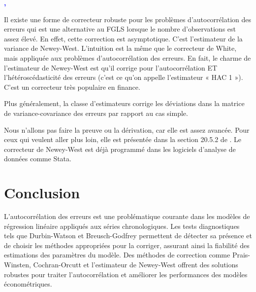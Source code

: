 \documentclass[14pt]{extarticle} %
\theoremstyle{definition}
\theoremstyle{plain}
\begin{document}
\textbf{\textcolor{blue}{\cite{gujarati2010}, \cite{greene2018}}}

Il existe une forme de correcteur robuste pour les problèmes d’autocorrélation des erreurs qui est une alternative au FGLS lorsque le nombre d’observations est assez élevé. En effet, cette correction est asymptotique. C’est l’estimateur de la variance de Newey-West. L’intuition est la même que le correcteur de White, mais appliquée aux problèmes d’autocorrélation des erreurs. En fait, le charme de l’estimateur de Newey-West est qu’il corrige pour l’autocorrélation ET l’hétéroscédasticité des erreurs (c’est ce qu’on appelle l’estimateur « HAC 1 »). C’est un correcteur très populaire en finance.

Plus généralement, la classe d’estimateurs corrige les déviations dans la matrice de variance-covariance des erreurs par rapport au cas simple.

Nous n’allons pas faire la preuve ou la dérivation, car elle est assez avancée. Pour ceux qui veulent aller plus loin, elle est présentée dans la section 20.5.2 de \textcolor{blue}{\cite{greene2018}}. Le correcteur de Newey-West est déjà programmé dans les logiciels d’analyse de données comme Stata.

\section{Conclusion}

L'autocorrélation des erreurs est une problématique courante dans les modèles de régression linéaire appliqués aux séries chronologiques. Les tests diagnostiques tels que Durbin-Watson et Breusch-Godfrey permettent de détecter sa présence et de choisir les méthodes appropriées pour la corriger, assurant ainsi la fiabilité des estimations des paramètres du modèle. Des méthodes de correction comme Prais-Winsten, Cochran-Orcutt et l'estimateur de Newey-West offrent des solutions robustes pour traiter l'autocorrélation et améliorer les performances des modèles économétriques.

\printbibliography
\end{document}
